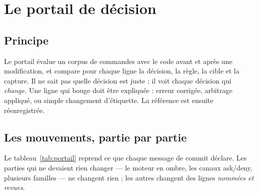\section{Le portail de décision}
\label{sec:portail}

\subsection{Principe}
Le portail évalue un corpus de \nbcorpus{} commandes avec le code avant et après une
modification, et compare pour chaque
ligne la décision, la règle, la cible et la capture. Il ne sait pas quelle décision est juste ;
il voit chaque décision qui \emph{change}. Une ligne qui bouge doit être expliquée : erreur
corrigée, arbitrage appliqué, ou simple changement d'étiquette. La référence est ensuite
réenregistrée.

\subsection{Les mouvements, partie par partie}
Le tableau~\ref{tab:portail} reprend ce que chaque message de commit déclare. Les parties qui
ne devaient rien changer --- le moteur en ombre, les canaux ask/deny, plusieurs familles --- ne
changent rien ; les autres changent des lignes \emph{nommées et revues}.

